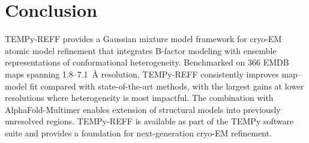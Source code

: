 \documentclass[11pt]{article}
\begin{document}
\section{Conclusion}

TEMPy-REFF provides a Gaussian mixture model framework for cryo-EM atomic model refinement that integrates B-factor modeling with ensemble representations of conformational heterogeneity. Benchmarked on 366 EMDB maps spanning 1.8--7.1~\AA{} resolution, TEMPy-REFF consistently improves map--model fit compared with state-of-the-art methods, with the largest gains at lower resolutions where heterogeneity is most impactful. The combination with AlphaFold-Multimer enables extension of structural models into previously unresolved regions. TEMPy-REFF is available as part of the TEMPy software suite and provides a foundation for next-generation cryo-EM refinement.



\end{document}
